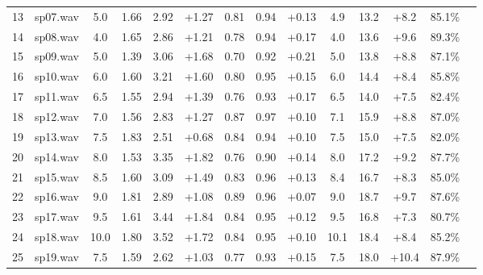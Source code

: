 \documentclass[11pt,a4paper]{report}
\begin{document}
\begin{table}[H]
\begin{tabularx}{\textwidth}{ccclcccccccccc}
13 & sp07.wav & 5.0 & 1.66 & 2.92 & +1.27 & 0.81 & 0.94 & +0.13 & 4.9 & 13.2 & +8.2 & 85.1\% \\
14 & sp08.wav & 4.0 & 1.65 & 2.86 & +1.21 & 0.78 & 0.94 & +0.17 & 4.0 & 13.6 & +9.6 & 89.3\% \\
15 & sp09.wav & 5.0 & 1.39 & 3.06 & +1.68 & 0.70 & 0.92 & +0.21 & 5.0 & 13.8 & +8.8 & 87.1\% \\
16 & sp10.wav & 6.0 & 1.60 & 3.21 & +1.60 & 0.80 & 0.95 & +0.15 & 6.0 & 14.4 & +8.4 & 85.8\% \\
17 & sp11.wav & 6.5 & 1.55 & 2.94 & +1.39 & 0.76 & 0.93 & +0.17 & 6.5 & 14.0 & +7.5 & 82.4\% \\
18 & sp12.wav & 7.0 & 1.56 & 2.83 & +1.27 & 0.87 & 0.97 & +0.10 & 7.1 & 15.9 & +8.8 & 87.0\% \\
19 & sp13.wav & 7.5 & 1.83 & 2.51 & +0.68 & 0.84 & 0.94 & +0.10 & 7.5 & 15.0 & +7.5 & 82.0\% \\
20 & sp14.wav & 8.0 & 1.53 & 3.35 & +1.82 & 0.76 & 0.90 & +0.14 & 8.0 & 17.2 & +9.2 & 87.7\% \\
21 & sp15.wav & 8.5 & 1.60 & 3.09 & +1.49 & 0.83 & 0.96 & +0.13 & 8.4 & 16.7 & +8.3 & 85.0\% \\
22 & sp16.wav & 9.0 & 1.81 & 2.89 & +1.08 & 0.89 & 0.96 & +0.07 & 9.0 & 18.7 & +9.7 & 87.6\% \\
23 & sp17.wav & 9.5 & 1.61 & 3.44 & +1.84 & 0.84 & 0.95 & +0.12 & 9.5 & 16.8 & +7.3 & 80.7\% \\
24 & sp18.wav & 10.0 & 1.80 & 3.52 & +1.72 & 0.84 & 0.95 & +0.10 & 10.1 & 18.4 & +8.4 & 85.2\% \\
25 & sp19.wav & 7.5 & 1.59 & 2.62 & +1.03 & 0.77 & 0.93 & +0.15 & 7.5 & 18.0 & +10.4 & 87.9\% \\
\bottomrule
\end{tabularx}
\end{table}
\end{document}
